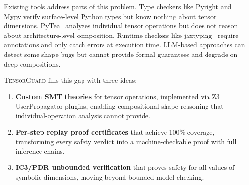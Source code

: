 \documentclass[11pt]{article}
\begin{document}
Existing tools address parts of this problem.  Type checkers like
Pyright and Mypy verify surface-level Python types but know nothing
about tensor dimensions.  PyTea~\cite{pytea} analyzes individual tensor
operations but does not reason about architecture-level composition.
Runtime checkers like jaxtyping~\cite{jaxtyping} require annotations
and only catch errors at execution time.  LLM-based approaches
can detect some shape bugs but cannot provide formal guarantees and
degrade on deep compositions.

\textsc{TensorGuard} fills this gap with three ideas:
\begin{enumerate}[leftmargin=2em]
  \item \textbf{Custom SMT theories} for tensor operations, implemented
    via Z3 UserPropagator plugins, enabling compositional shape reasoning
    that individual-operation analysis cannot provide.
  \item \textbf{Per-step replay proof certificates} that achieve 100\%
    coverage, transforming every safety verdict into a machine-checkable
    proof with full inference chains.
  \item \textbf{IC3/PDR unbounded verification} that proves safety for
    all values of symbolic dimensions, moving beyond bounded model
    checking.
\end{enumerate}
\end{document}
